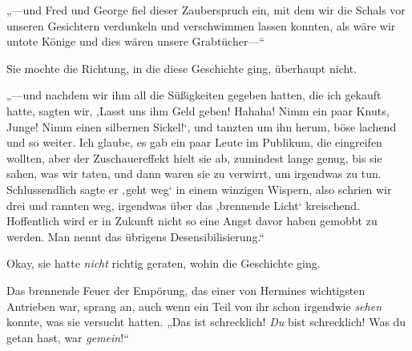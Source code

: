 „—und Fred und George fiel dieser Zauberspruch ein, mit dem wir die Schals vor unseren Gesichtern verdunkeln und verschwimmen lassen konnten, als wäre wir untote Könige und dies wären unsere Grabtücher—“

Sie mochte die Richtung, in die diese Geschichte ging, überhaupt nicht.

„—und nachdem wir ihm all die Süßigkeiten gegeben hatten, die ich gekauft hatte, sagten wir, ‚Lasst uns ihm Geld geben! Hahaha! Nimm ein paar Knuts, Junge! Nimm einen silbernen Sickel!‘, und tanzten um ihn herum, böse lachend und so weiter. Ich glaube, es gab ein paar Leute im Publikum, die eingreifen wollten, aber der Zuschauereffekt hielt sie ab, zumindest lange genug, bis sie sahen, was wir taten, und dann waren sie zu verwirrt, um irgendwas zu tun. Schlussendlich sagte er ‚geht weg‘ in einem winzigen Wispern, also schrien wir drei und rannten weg, irgendwas über das ‚brennende Licht‘ kreischend. Hoffentlich wird er in Zukunft nicht so eine Angst davor haben gemobbt zu werden. Man nennt das übrigens Desensibilisierung.“

Okay, sie hatte \emph{nicht} richtig geraten, wohin die Geschichte ging.

Das brennende Feuer der Empörung, das einer von Hermines wichtigsten Antrieben war, sprang an, auch wenn ein Teil von ihr schon irgendwie \emph{sehen} konnte, was sie versucht hatten. „Das ist schrecklich! \emph{Du} bist schrecklich! Was du getan hast, war \emph{gemein}!“


